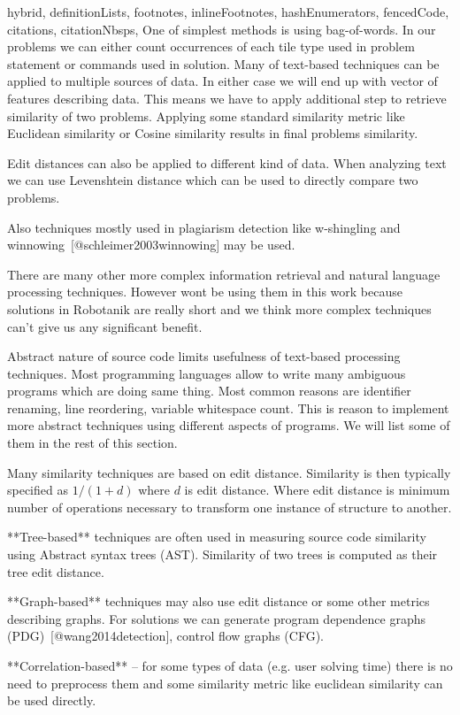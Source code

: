 \documentclass[
  digital, %
  table,   %
  lof,     %
  lot,     %
]{fithesis3}
\begin{document}
\begin{markdown*}{%
  hybrid,
  definitionLists,
  footnotes,
  inlineFootnotes,
  hashEnumerators,
  fencedCode,
  citations,
  citationNbsps,
}
One of simplest methods is using bag-of-words. In our problems we can either count occurrences of each tile type used in problem statement or commands used in solution. Many of text-based techniques can be applied to multiple sources of data. In either case we will end up with vector of features describing data. This means we have to apply additional step to retrieve similarity of two problems. Applying some standard similarity metric like Euclidean similarity or Cosine similarity results in final problems similarity.

Edit distances can also be applied to different kind of data. When analyzing text we can use Levenshtein distance which can be used to directly compare two problems.

Also techniques mostly used in plagiarism detection like w-shingling and winnowing~[@schleimer2003winnowing] may be used.

There are many other more complex information retrieval and natural language processing techniques. However wont be using them in this work because solutions in Robotanik are really short and we think more complex techniques can't give us any significant benefit.

Abstract nature of source code limits usefulness of text-based processing techniques. Most programming languages allow to write many ambiguous programs which are doing same thing. Most common reasons are identifier renaming, line reordering, variable whitespace count. This is reason to implement more abstract techniques using different aspects of programs. We will list some of them in the rest of this section.

Many similarity techniques are based on edit distance. Similarity is then typically specified as $1/(1+d)$ where $d$ is edit distance. Where edit distance is minimum number of operations necessary to transform one instance of structure to another.

**Tree-based** techniques are often used in measuring source code similarity using Abstract syntax trees (AST). Similarity of two trees is computed as their tree edit distance.

**Graph-based** techniques may also use edit distance or some other metrics describing graphs. For solutions we can generate program dependence graphs (PDG)~[@wang2014detection], control flow graphs (CFG).

**Correlation-based** -- for some types of data (e.g. user solving time) there is no need to preprocess them and some similarity metric like euclidean similarity can be used directly.


\end{markdown*}
\end{document}
